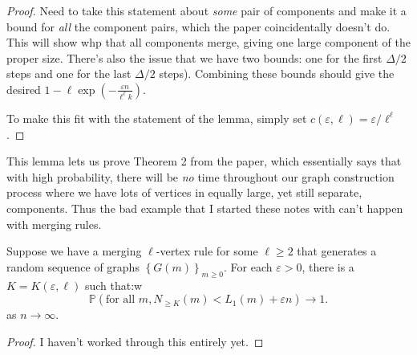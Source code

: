 \documentclass[twoside,10pt]{report}
\begin{document}
\begin{proof}
	{\color{red}Need to take this statement about \textit{some} pair of components and make it a bound for \textit{all} the component pairs, which the paper coincidentally doesn't do. This will show whp that all components merge, giving one large component of the proper size. There's also the issue that we have two bounds: one for the first $\Delta/2$ steps and one for the last $\Delta/2$ steps). Combining these bounds should give the desired $1-\ell \exp\left( -\frac{\varepsilon n}{\ell^{\ell}k}  \right)$.}

		To make this fit with the statement of the lemma, simply set $c(\varepsilon,\ell) = \varepsilon/\ell^{\ell}$.
\end{proof}

This lemma lets us prove Theorem 2 from the paper, which essentially says that with high probability, there will be \textit{no} time throughout our graph construction process where we have lots of vertices in equally large, yet still separate, components. Thus the bad example that I started these notes with can't happen with merging rules.

\setcounter{thrm}{1}
\begin{thrm}[]
	Suppose we have a merging $\ell$-vertex rule for some $\ell \geq 2$ that generates a random sequence of graphs $\left\{ G(m) \right\}_{m \geq 0}$. For each $\varepsilon > 0$, there is a $K = K(\varepsilon,\ell)$ such that:w
	\[
		\mathbb{P}(\text{for all } m, N_{\geq K}(m) < L_1(m) + \varepsilon n) \to 1.
	\] as $n\to \infty$.
\end{thrm}
\begin{proof}
	{\color{red}I haven't worked through this entirely yet.}
\end{proof}
\end{document}
